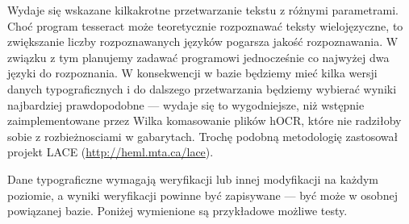 \documentclass[12]{mwart}
\def\p#1{\textsf{#1}}
\begin{document}
Wydaje się wskazane kilkakrotne przetwarzanie tekstu z różnymi
parametrami. Choć program \p{tesseract} może teoretycznie rozpoznawać
teksty wielojęzyczne, to zwiększanie liczby rozpoznawanych języków
pogarsza jakość rozpoznawania. W związku z tym planujemy zadawać
programowi jednocześnie co najwyżej dwa języki do rozpoznania. W
konsekwencji w bazie będziemy mieć kilka wersji danych typograficznych
i do dalszego przetwarzania będziemy wybierać wyniki najbardziej
prawdopodobne --- wydaje się to wygodniejsze, niż wstępnie
zaimplementowane przez Wilka komasowanie plików hOCR, które nie
radziłoby sobie z rozbieżnosciami w gabarytach. Trochę podobną metodologię
zastosował projekt LACE (\url{http://heml.mta.ca/lace}).

Dane typograficzne wymagają weryfikacji lub innej modyfikacji na
każdym poziomie, a wyniki weryfikacji powinne być zapisywane --- być
może w osobnej powiązanej bazie. Poniżej wymienione są przykładowe
możliwe testy.
\end{document}
